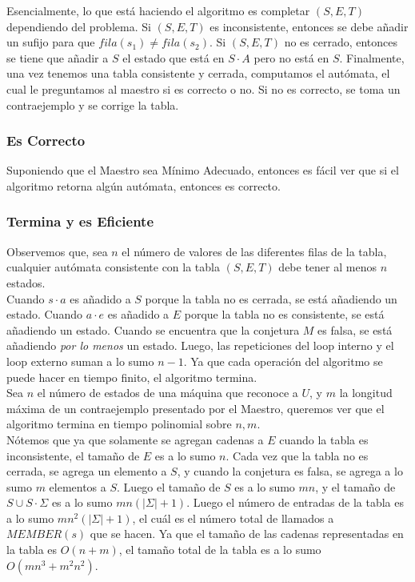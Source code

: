 \documentclass[12pt]{amsart}
\begin{document}
Esencialmente, lo que está haciendo el algoritmo es completar $(S,E,T)$ dependiendo del problema. Si $(S,E,T)$ es inconsistente, entonces se debe añadir un sufijo para que $fila(s_1) \neq fila(s_2)$. Si $(S,E,T)$ no es cerrado, entonces se tiene que añadir a $S$ el estado que está en $S \cdot A$ pero no está en $S$. Finalmente, una vez tenemos una tabla consistente y cerrada, computamos el autómata, el cual le preguntamos al maestro si es correcto o no. Si no es correcto, se toma un contraejemplo y se corrige la tabla. \\

\subsubsection{Es Correcto}

Suponiendo que el Maestro sea Mínimo Adecuado, entonces es fácil ver que si el algoritmo retorna algún autómata, entonces es correcto.

\subsubsection{Termina y es Eficiente}

Observemos que, sea $n$ el número de valores de las diferentes filas de la tabla, cualquier autómata consistente con la tabla $(S,E,T)$ debe tener al menos $n$ estados. \\

Cuando $s \cdot a$ es añadido a $S$ porque la tabla no es cerrada, se está añadiendo un estado. Cuando $a \cdot e$ es añadido a $E$ porque la tabla no es consistente, se está añadiendo un estado. Cuando se encuentra que la conjetura $M$ es falsa, se está añadiendo \textit{por lo menos} un estado. Luego, las repeticiones del loop interno y el loop externo suman a lo sumo $n-1$. Ya que cada operación del algoritmo se puede hacer en tiempo finito, el algoritmo termina. \\

Sea $n$ el número de estados de una máquina que reconoce a $U$, y $m$ la longitud máxima de un contraejemplo presentado por el Maestro, queremos ver que el algoritmo termina en tiempo polinomial sobre $n,m$. \\

Nótemos que ya que solamente se agregan cadenas a $E$ cuando la tabla es inconsistente, el tamaño de $E$ es a lo sumo $n$. Cada vez que la tabla no es cerrada, se agrega un elemento a $S$, y cuando la conjetura es falsa, se agrega a lo sumo $m$ elementos a $S$. Luego el tamaño de $S$ es a lo sumo $mn$, y el tamaño de $S \cup S \cdot \Sigma$ es a lo sumo $mn(|\Sigma| + 1)$. Luego el número de entradas de la tabla es a lo sumo $mn^2 (|\Sigma| + 1)$, el cuál es el número total de llamados a $MEMBER(s)$ que se hacen. Ya que el tamaño de las cadenas representadas en la tabla es $O(n+m)$, el tamaño total de la tabla es a lo sumo $O(mn^3 + m^2 n^2 )$. \\
\end{document}

